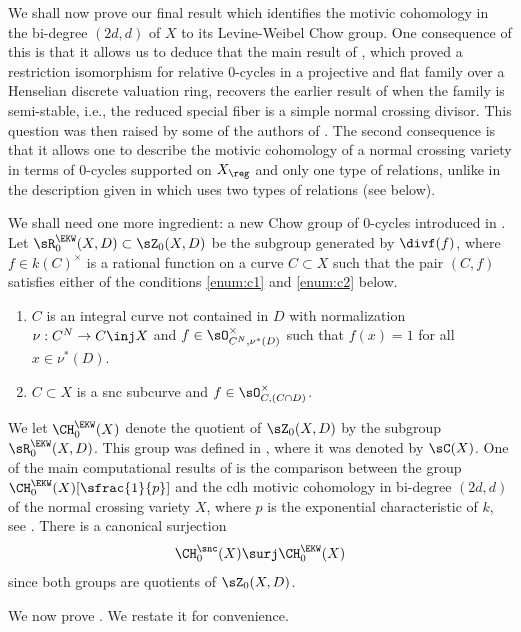 We shall now prove our final result which identifies the
motivic cohomology in the bi-degree $(2d,d)$ of $X$ to its Levine-Weibel Chow
group. One consequence of this is that it allows us to deduce that the
main result of \cite{BKres}, which proved a restriction isomorphism for
relative $0$-cycles in a projective and flat family over a Henselian
discrete valuation
ring, recovers the earlier result of \cite{EKW} when the family is semi-stable,
i.e., the reduced special fiber is a simple normal crossing divisor.
This question was then raised by some of the authors of \cite{EKW}.
The second consequence is that it allows one to describe the
motivic cohomology of a normal crossing variety in terms of $0$-cycles
supported on $X_\reg$ and only one type of relations, unlike in the
description given in \cite{EKW} which uses two types of relations
(see below).

We shall need one more ingredient: a new Chow group of $0$-cycles
introduced in \cite[\S2]{EKW}.
Let $\sR^{\EKW}_0(X,D) \subset \sZ_0(X,D)$ be the subgroup generated
by $\divf(f)$, where $f \in k(C)^{\times}$ is a rational function on a curve
$C \subset X$ such that the pair $(C,f)$ satisfies either of the conditions
\eqref{enum:c1} and \eqref{enum:c2} below.
\begin{enumerate}
\item\label{enum:c1}
$C$ is an integral curve not contained in $D$ with normalization
$\nu: C^N \to C \inj X$ and $f \in \sO^{\times}_{C^N, \nu^*(D)}$ such that
$f(x) = 1$ for all $x \in \nu^*(D)$.
\item\label{enum:c2}
$C \subset X$ is a snc subcurve and
$f \in \sO^{\times}_{C, (C\cap D)}$.
\end{enumerate}

We let $\CH^{\EKW}_0(X)$ denote the quotient of $\sZ_0(X,D)$ by the subgroup
$\sR^{\EKW}_0(X,D)$. This group was defined in \cite[\S2]{EKW}, where
it was denoted by $\sC(X)$. One of the main computational results of
\cite{EKW} is the comparison between the group $\CH^{\EKW}_0(X)[\sfrac{1}{p}]$ and
the cdh motivic cohomology in bi-degree $(2d,d)$ of the normal crossing variety
$X$, where $p$ is the exponential characteristic of $k$, see \cite[Th.\,7.1]{EKW}.
There is a canonical surjection
\begin{equation}\label{eqn:surjSNC-EKW}
\CH_0^{\snc}(X) \surj \CH_0^{\EKW}(X)
\end{equation}
since both groups are quotients of $\sZ_0(X,D)$.

We now prove . We restate it for convenience.

